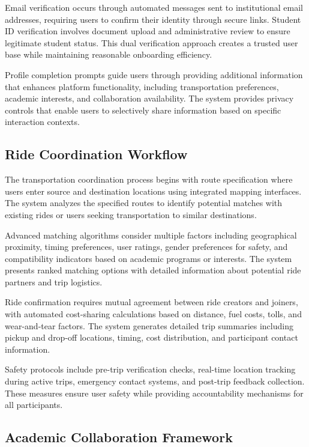 \documentclass[conference]{IEEEtran}
\begin{document}
Email verification occurs through automated messages sent to institutional email addresses, requiring users to confirm their identity through secure links. Student ID verification involves document upload and administrative review to ensure legitimate student status. This dual verification approach creates a trusted user base while maintaining reasonable onboarding efficiency.

Profile completion prompts guide users through providing additional information that enhances platform functionality, including transportation preferences, academic interests, and collaboration availability. The system provides privacy controls that enable users to selectively share information based on specific interaction contexts.

\subsection{Ride Coordination Workflow}

The transportation coordination process begins with route specification where users enter source and destination locations using integrated mapping interfaces. The system analyzes the specified routes to identify potential matches with existing rides or users seeking transportation to similar destinations.

Advanced matching algorithms consider multiple factors including geographical proximity, timing preferences, user ratings, gender preferences for safety, and compatibility indicators based on academic programs or interests. The system presents ranked matching options with detailed information about potential ride partners and trip logistics.

Ride confirmation requires mutual agreement between ride creators and joiners, with automated cost-sharing calculations based on distance, fuel costs, tolls, and wear-and-tear factors. The system generates detailed trip summaries including pickup and drop-off locations, timing, cost distribution, and participant contact information.

Safety protocols include pre-trip verification checks, real-time location tracking during active trips, emergency contact systems, and post-trip feedback collection. These measures ensure user safety while providing accountability mechanisms for all participants.

\subsection{Academic Collaboration Framework}
\end{document}
